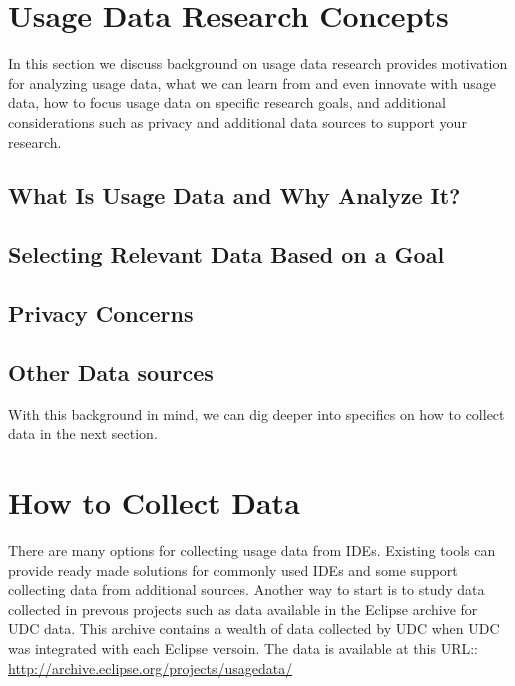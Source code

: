 
\section{Usage Data Research Concepts}

In this section we discuss background on usage data research provides motivation for analyzing usage data, what we can learn from and even innovate with usage data, how to focus usage data on specific research goals, and additional considerations such as privacy and additional data sources to support your research.


\subsection{What Is Usage Data and Why Analyze It?}



\subsection{Selecting Relevant Data Based on a Goal}


\subsection{Privacy Concerns}


\subsection{Other Data sources}


With this background in mind, we can dig deeper into specifics on how to collect data in the next section.

\section{How to Collect Data}
\label{SecHowToCollectData}

There are many options for collecting usage data from IDEs.   Existing tools can provide ready made solutions for commonly used IDEs and some support collecting data from additional sources.   Another way to start is to study data collected in prevous projects such as data available in the Eclipse archive for UDC data.  This archive contains a wealth of data collected by UDC when UDC was integrated with each Eclipse versoin.  The data is available at this URL::
\url{http://archive.eclipse.org/projects/usagedata/}

